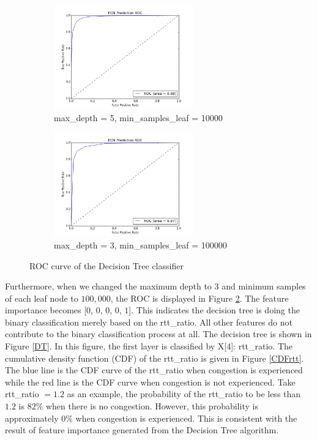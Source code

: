 \begin{figure}[!htb]\centering
   \begin{subfigure}{0.49\textwidth}
     \includegraphics[width=6cm]{DecisionTreeRoc.png}
\caption{max\_depth = 5, min\_samples\_leaf = 10000}
\label{DecisionTreeRoc}

   \end{subfigure}
   \begin {subfigure}{0.49\textwidth}
     \includegraphics[width=6cm]{DTRoc.png}
\caption{max\_depth = 3, min\_samples\_leaf = 100000}
\label{DTRoc}
   \end{subfigure}
   \caption{ROC curve of the Decision Tree classifier}
\label{fig:roc1}
\end{figure}
Furthermore, when we changed the maximum depth to $3$ and minimum samples of each leaf node to $100,000$, the ROC is displayed in Figure \ref{DTRoc}. The feature importance becomes [$0$, $0$, $0$, $0$, $1$]. This indicates the decision tree is doing the binary classification merely based on the rtt\_ratio. All other features do not contribute to the binary classification process at all. 
The decision tree is shown in Figure \ref{DT}. In this figure, the first layer is classified by X[4]: rtt\_ratio. The cumulative density function (CDF) of the rtt\_ratio is given in Figure \ref{CDFrtt}. The blue line is the CDF curve of  the rtt\_ratio when congestion is experienced while the red line is the CDF curve when congestion is not experienced. Take rtt\_ratio $=1.2$ as an example, the probability of the rtt\_ratio to be less than $1.2$ is $82\%$ when there is no congestion. However, this probability is approximately $0\%$ when congestion is experienced. This is consistent with the result of feature importance generated from the Decision Tree algorithm. 


